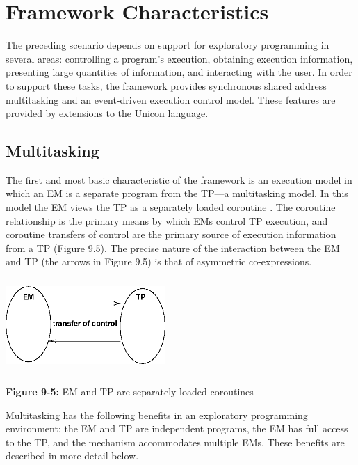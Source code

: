 \section{Framework Characteristics}

The preceding scenario depends on support for exploratory programming
in several areas: controlling a program's execution, obtaining execution
information, presenting large quantities of information,
and interacting with the user.  In order to support these tasks, the
framework provides synchronous shared address multitasking and an
event-driven execution control model.
These features are provided by extensions to the Unicon language.


\subsection{Multitasking}

The first and most basic characteristic of the framework is an
execution model in which an EM is a separate program from the TP---a
multitasking model.
In this model the EM views the TP as a separately loaded coroutine
  \cite{Marlin80}.  The coroutine
relationship is the primary means by which EMs control TP
execution, and coroutine transfers of 
control are the primary source of execution information from a TP
(Figure 9.5).  The precise nature of the interaction between the EM and
TP (the arrows in Figure 9.5) is that of asymmetric co-expressions.

\begin{center}
\includegraphics[width=2.4in,height=1.4in]{tpem.png}
\end{center}

{\sffamily\bfseries Figure 9-5:}
{\sffamily EM and TP are separately loaded coroutines}

\bigskip


Multitasking has the following benefits in an exploratory
programming environment: the EM and TP are independent programs, the
EM has full access to the TP, and the mechanism accommodates multiple
EMs.  These benefits are described in more detail below.


